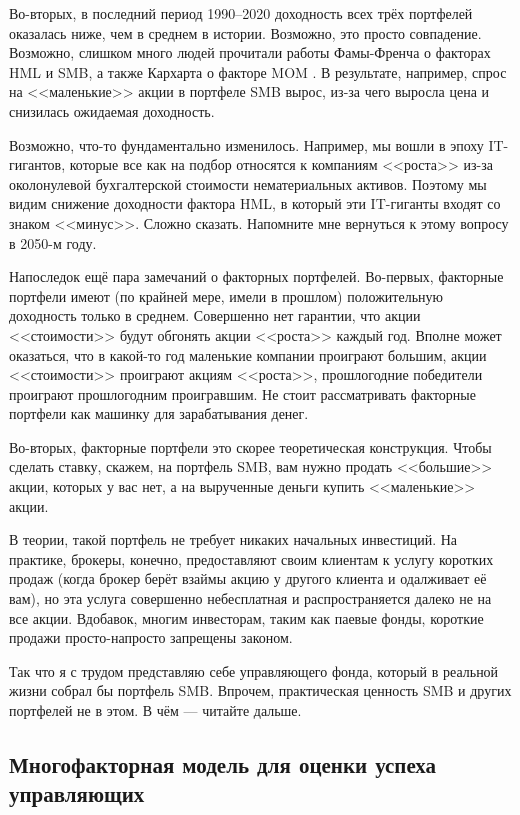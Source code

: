 Во-вторых, в последний период 1990--2020 доходность всех трёх портфелей оказалась ниже, чем в среднем в истории. Возможно, это просто совпадение. Возможно, слишком много людей прочитали работы Фамы-Френча о факторах HML и SMB, а также Кархарта о факторе MOM \cite{carhart1997persistence}. В результате, например, спрос на <<маленькие>> акции в портфеле SMB вырос, из-за чего выросла цена и снизилась ожидаемая доходность.

Возможно, что-то фундаментально изменилось. Например, мы вошли в эпоху IT-гигантов, которые все как на подбор относятся к компаниям <<роста>> из-за околонулевой бухгалтерской стоимости нематериальных активов. Поэтому мы видим снижение доходности фактора HML, в который эти IT-гиганты входят со знаком <<минус>>. Сложно сказать. Напомните мне вернуться к этому вопросу в 2050-м году.

Напоследок ещё пара замечаний о факторных портфелей. Во-первых, факторные портфели имеют (по крайней мере, имели в прошлом) положительную доходность только в среднем. Совершенно нет гарантии, что акции <<стоимости>> будут обгонять акции <<роста>> каждый год. Вполне может оказаться, что в какой-то год маленькие компании проиграют большим, акции <<стоимости>> проиграют акциям <<роста>>, прошлогодние победители проиграют прошлогодним проигравшим. Не стоит рассматривать факторные портфели как машинку для зарабатывания денег.

Во-вторых, факторные портфели это скорее теоретическая конструкция. Чтобы сделать ставку, скажем, на портфель SMB, вам нужно продать  <<большие>> акции, которых у вас нет, а на вырученные деньги купить <<маленькие>> акции.

В теории, такой портфель не требует никаких начальных инвестиций. На практике, брокеры, конечно, предоставляют своим клиентам к услугу коротких продаж (когда брокер берёт взаймы акцию у другого клиента и одалживает её вам), но эта услуга совершенно небесплатная и распространяется далеко не на все акции. Вдобавок, многим инвесторам, таким как паевые фонды, короткие продажи просто-напросто запрещены законом.

Так что я с трудом представляю себе управляющего фонда, который в реальной жизни собрал бы портфель SMB. Впрочем, практическая ценность SMB и других портфелей не в этом. В чём --- читайте дальше.

\subsection{Многофакторная модель для оценки успеха управляющих}

